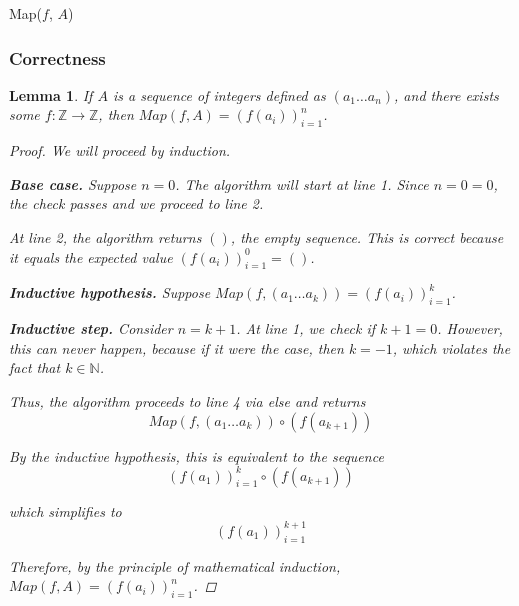 \documentclass{article}
\newtheorem{lemma}{Lemma}
\theoremstyle{definition}
\begin{document}
\begin{algorithm}


    \caption{Map($f$, $A$)}
\end{algorithm}

\subsubsection{Correctness}

\begin{lemma}
    If $A$ is a sequence of integers defined as $\left(a_1 \dots a_n\right)$, and there exists some $f: \mathbb{Z} \rightarrow \mathbb{Z}$, then $Map(f, A) = (f(a_i))^n_{i=1}$.
    \label{lem:map}

    \begin{proof} We will proceed by induction.

        \textbf{Base case.} Suppose $n = 0$. The algorithm will start at line 1. Since $n = 0 = 0$, the check passes and we proceed to line 2. 
        
        At line 2, the algorithm returns $()$, the empty sequence. This is correct because it equals the expected value $(f(a_i))^0_{i=1} = ()$.

        \textbf{Inductive hypothesis.} Suppose $Map(f, (a_1\dots a_k)) = (f(a_i))^k_{i=1}$.

        \textbf{Inductive step.} Consider $n = k + 1$. At line 1, we check if $k + 1 = 0$. However, this can never happen, because if it were the case, then $k = -1$, which violates the fact that $k \in \mathbb{N}$.

        Thus, the algorithm proceeds to line 4 via else and returns 
        $$Map(f, (a_1 \dots a_{k})) \circ (f(a_{k+1}))$$
        
        By the inductive hypothesis, this is equivalent to the sequence 
        $$(f(a_1))^k_{i=1} \circ (f(a_{k+1}))$$

        which simplifies to 
        $$(f(a_1))^{k+1}_{i=1}$$

        Therefore, by the principle of mathematical induction, $Map(f, A) = (f(a_i))^n_{i=1}$.
    \end{proof}
\end{lemma}
\end{document}
